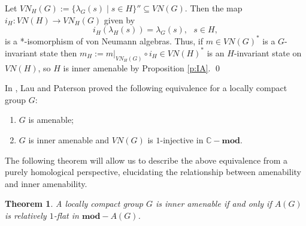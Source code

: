 \documentclass[preprint,12pt]{elsarticle}
\newtheorem{thm}{Theorem}[section]
\newcommand{\LG}{VN(G)}
\newcommand{\lm}{\lambda}
\newcommand{\C}{\mathbb{C}}
\begin{document}
\begin{pf} Let $VN_H(G):=\{\lm_G(s)\mid s\in H\}''\subseteq\LG$. Then the map $i_H:VN(H)\rightarrow VN_H(G)$ given by
$$i_H(\lm_H(s))=\lm_G(s), \ \ \ s\in H,$$
is a *-isomorphism of von Neumann algebras. Thus, if $m\in\LG^*$ is a $G$-invariant state then $m_H:=m|_{VN_H(G)}\circ i_H\in VN(H)^*$ is an $H$-invariant state on $VN(H)$, so $H$ is inner amenable by Proposition \ref{p:IA}.
\qed\end{pf}


In \cite[Corollary 3.2]{LP1}, Lau and Paterson proved the following equivalence for a locally compact group $G$:
\begin{enumerate}
\item $G$ is amenable;
\item $G$ is inner amenable and $\LG$ is $1$-injective in $\C-\mathbf{mod}$.
\end{enumerate}
The following theorem will allow us to describe the above equivalence from a purely homological perspective, elucidating the relationship between amenability and inner amenability.

\begin{thm}\label{t:IA=relinj}   A locally compact group $G$ is inner amenable if and only if $A(G)$ is relatively $1$-flat in $\mathbf{mod}-A(G)$.
\end{thm}
\end{document}
